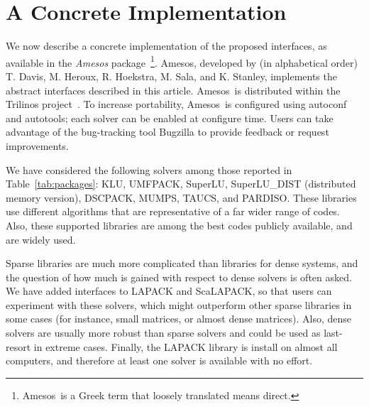 \documentclass[acmtocl]{acmtrans2m}
\newcommand{\amesos}{{\sc Amesos}}
\begin{document}
\section{A Concrete Implementation}
\label{sec:concrete}

We now describe a concrete implementation of the proposed interfaces, as
available in the {\sl \amesos} package~\cite{Amesos-Reference-Guide}\footnote{
\amesos\ is a Greek term that loosely translated means direct.}.
\amesos,
developed by (in alphabetical order) T. Davis, M. Heroux, R. Hoekstra, M.
Sala, and K. Stanley, implements the abstract interfaces described in this
article. \amesos\ is distributed within the
Trilinos project~\cite{heroux05trilinos,trilinos-home-page}.
To increase portability,
\amesos\ is
configured using autoconf and autotools; each solver can be enabled at
configure time. Users can take advantage of the bug-tracking tool Bugzilla to
provide feedback or request improvements.

We have considered the following solvers among those
reported in Table~\ref{tab:packages}: KLU, UMFPACK, SuperLU, SuperLU\_DIST
(distributed memory version),
  DSCPACK, MUMPS, TAUCS, and PARDISO.
These libraries use different algorithms that are
representative of a far wider range of codes. Also, these supported libraries are
among the best codes publicly available, and are widely used.  

Sparse libraries are much more complicated than libraries for dense systems,
  and the question of how much is gained with respect to dense solvers 
  is often asked. We have added
  interfaces to LAPACK and ScaLAPACK, so that users can experiment with these
  solvers, which might outperform other sparse libraries in some cases 
  (for instance, small matrices, or almost dense matrices). Also, dense
  solvers are usually more robust than sparse solvers and could be used as
  last-resort in extreme cases. Finally, the LAPACK library is install on
  almost all computers, and therefore at least one solver is available with no
  effort.
\end{document}
